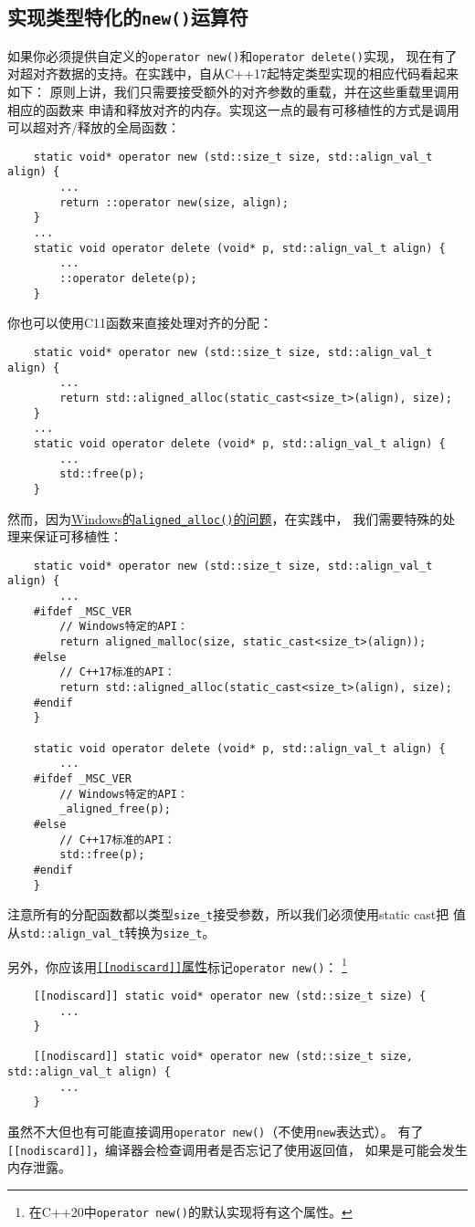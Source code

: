 \subsection{实现类型特化的\texttt{new()}运算符}\label{ch30.2.2}
如果你必须提供自定义的\texttt{operator new()}和\texttt{operator delete()}实现，
现在有了对超对齐数据的支持。在实践中，自从C++17起特定类型实现的相应代码看起来如下：
原则上讲，我们只需要接受额外的对齐参数的重载，并在这些重载里调用相应的函数来
申请和释放对齐的内存。实现这一点的最有可移植性的方式是调用可以超对齐/释放的全局函数：
\begin{lstlisting}
    static void* operator new (std::size_t size, std::align_val_t align) {
        ...
        return ::operator new(size, align);
    }
    ...
    static void operator delete (void* p, std::align_val_t align) {
        ...
        ::operator delete(p);
    }
\end{lstlisting}
你也可以使用C11函数来直接处理对齐的分配：
\begin{lstlisting}
    static void* operator new (std::size_t size, std::align_val_t align) {
        ...
        return std::aligned_alloc(static_cast<size_t>(align), size);
    }
    ...
    static void operator delete (void* p, std::align_val_t align) {
        ...
        std::free(p);
    }
\end{lstlisting}
然而，因为\hyperref[ch30.1.1]{Windows的\texttt{aligned\_alloc()}的问题}，在实践中，
我们需要特殊的处理来保证可移植性：
\begin{lstlisting}
    static void* operator new (std::size_t size, std::align_val_t align) {
        ...
    #ifdef _MSC_VER
        // Windows特定的API：
        return aligned_malloc(size, static_cast<size_t>(align));
    #else
        // C++17标准的API：
        return std::aligned_alloc(static_cast<size_t>(align), size);
    #endif
    }

    static void operator delete (void* p, std::align_val_t align) {
        ...
    #ifdef _MSC_VER
        // Windows特定的API：
        _aligned_free(p);
    #else
        // C++17标准的API：
        std::free(p);
    #endif
    }
\end{lstlisting}
注意所有的分配函数都以类型\texttt{size\_t}接受参数，所以我们必须使用static cast把
值从\texttt{std::align\_val\_t}转换为\texttt{size\_t}。

另外，你应该用\hyperref[ch7.1]{\texttt{[[nodiscard]]}属性}标记\texttt{operator new()}：
\footnote{在C++20中\texttt{operator new()}的默认实现将有这个属性。}
\begin{lstlisting}
    [[nodiscard]] static void* operator new (std::size_t size) {
        ...
    }

    [[nodiscard]] static void* operator new (std::size_t size, std::align_val_t align) {
        ...
    }
\end{lstlisting}
虽然不大但也有可能直接调用\texttt{operator new()}（不使用\texttt{new}表达式）。
有了\texttt{[[nodiscard]]}，编译器会检查调用者是否忘记了使用返回值，
如果是可能会发生内存泄露。

